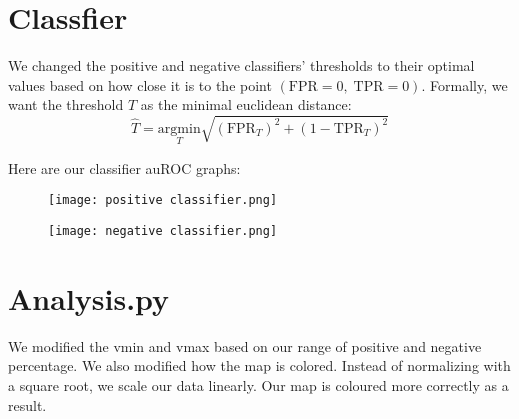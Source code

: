 \documentclass[11pt]{article}
\begin{document}
\begin{enumerate}
\section{Classfier}
	We changed the positive and negative classifiers' thresholds to their optimal values based on how close it is to the point $(\text{FPR} = 0,\; \text{TPR}=0)$. Formally, we want the threshold $T$ as the minimal euclidean distance:
	\begin{equation}
	    \hat{T} = \underset{T}{\text{argmin}}\sqrt{(\text{FPR}_T)^2 + (1 - \text{TPR}_T)^2}
	\end{equation}

Here are our classifier auROC graphs:
\begin{figure}[H]
    \begin{center}
  \texttt{[image: positive classifier.png]}
    \end{center}
\end{figure}
\begin{figure}[H]
    \begin{center}
  \texttt{[image: negative classifier.png]}
    \end{center}
\end{figure}

\section{Analysis.py}
    We modified the vmin and vmax based on our range of positive and negative percentage. We also modified how the map is colored.
      Instead of normalizing with a square root, we scale our data linearly. Our map is coloured more correctly as a result.
\end{enumerate}
\end{document}
